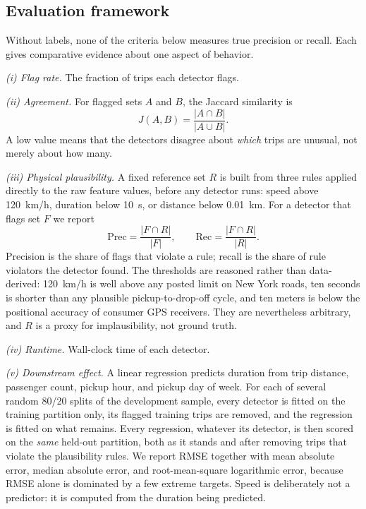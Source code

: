 \documentclass{ieeeaccess}
\begin{document}
\subsection{Evaluation framework}
Without labels, none of the criteria below measures true precision or recall. Each gives comparative evidence about one aspect of behavior.

\emph{(i) Flag rate.} The fraction of trips each detector flags.

\emph{(ii) Agreement.} For flagged sets $A$ and $B$, the Jaccard similarity is
\begin{equation}
J(A,B)=\frac{|A\cap B|}{|A\cup B|}.
\end{equation}
A low value means that the detectors disagree about \emph{which} trips are unusual, not merely about how many.

\emph{(iii) Physical plausibility.} A fixed reference set $R$ is built from three rules applied directly to the raw feature values, before any detector runs: speed above 120~km/h, duration below 10~s, or distance below 0.01~km. For a detector that flags set $F$ we report
\begin{equation}
\mathrm{Prec}=\frac{|F\cap R|}{|F|},\qquad \mathrm{Rec}=\frac{|F\cap R|}{|R|}.
\end{equation}
Precision is the share of flags that violate a rule; recall is the share of rule violators the detector found. The thresholds are reasoned rather than data-derived: 120~km/h is well above any posted limit on New York roads, ten seconds is shorter than any plausible pickup-to-drop-off cycle, and ten meters is below the positional accuracy of consumer GPS receivers. They are nevertheless arbitrary, and $R$ is a proxy for implausibility, not ground truth.

\emph{(iv) Runtime.} Wall-clock time of each detector.

\emph{(v) Downstream effect.} A linear regression predicts duration from trip distance, passenger count, pickup hour, and pickup day of week. For each of several random 80/20 splits of the development sample, every detector is fitted on the training partition only, its flagged training trips are removed, and the regression is fitted on what remains. Every regression, whatever its detector, is then scored on the \emph{same} held-out partition, both as it stands and after removing trips that violate the plausibility rules. We report RMSE together with mean absolute error, median absolute error, and root-mean-square logarithmic error, because RMSE alone is dominated by a few extreme targets. Speed is deliberately not a predictor: it is computed from the duration being predicted.
\end{document}
